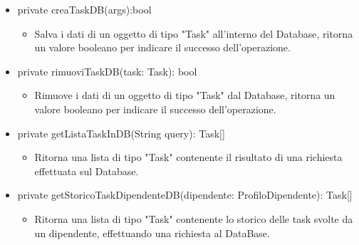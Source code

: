 \documentclass{report}
\begin{document}
\begin{itemize}
\begin{itemize}
\end{itemize}
\item private creaTaskDB(args):bool
\begin{itemize}
    \item Salva i dati di un oggetto di tipo "Task" all'interno del Database, ritorna un valore booleano per indicare il successo dell'operazione.
\end{itemize}
\item private rimuoviTaskDB(task: Task): bool
\begin{itemize}
    \item Rimuove i dati di un oggetto di tipo "Task" dal Database, ritorna un valore booleano per indicare il successo dell'operazione.
\end{itemize}
\item private getListaTaskInDB(String query): Task[]
\begin{itemize}
    \item Ritorna una lista di tipo "Task" contenente il risultato  di una richiesta effettuata sul Database.
\end{itemize}
\item private getStoricoTaskDipendenteDB(dipendente: ProfiloDipendente): Task[]
\begin{itemize}
    \item Ritorna una lista di tipo "Task" contenente lo storico delle task svolte da un dipendente, effettuando una richiesta al DataBase.
\end{itemize}
\end{itemize}
\end{document}
